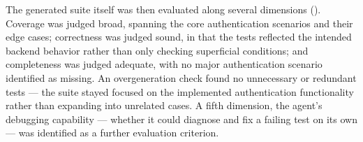 The generated suite itself was then evaluated along several dimensions (). Coverage was judged broad, spanning the core authentication scenarios and their edge cases; correctness was judged sound, in that the tests reflected the intended backend behavior rather than only checking superficial conditions; and completeness was judged adequate, with no major authentication scenario identified as missing. An overgeneration check found no unnecessary or redundant tests --- the suite stayed focused on the implemented authentication functionality rather than expanding into unrelated cases. A fifth dimension, the agent's debugging capability --- whether it could diagnose and fix a failing test on its own --- was identified as a further evaluation criterion.

